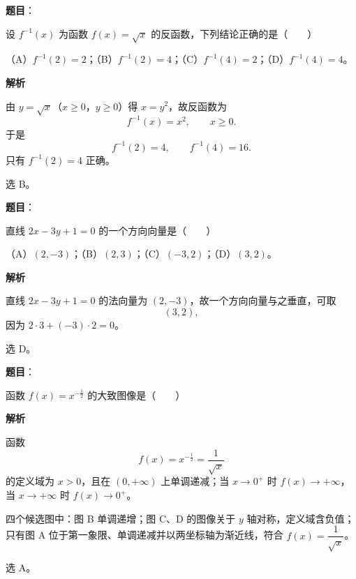 \begin{answer}

\textbf{题目}：

设 $f^{-1}(x)$ 为函数 $f(x)=\sqrt x$ 的反函数，下列结论正确的是\mbox{（　　）}

（A）$f^{-1}(2)=2$；（B）$f^{-1}(2)=4$；（C）$f^{-1}(4)=2$；（D）$f^{-1}(4)=4$。

\textbf{解析}

由 $y=\sqrt x$（$x\geqslant0$，$y\geqslant0$）得 $x=y^2$，故反函数为
\nopagebreak[4]
\[f^{-1}(x)=x^2,\qquad x\geqslant0.\]
于是
\nopagebreak[4]
\[f^{-1}(2)=4,\qquad f^{-1}(4)=16.\]
只有 $f^{-1}(2)=4$ 正确。

选 B。


\end{answer}
\begin{answer}

\textbf{题目}：

直线 $2x-3y+1=0$ 的一个方向向量是\mbox{（　　）}

（A）$(2,-3)$；（B）$(2,3)$；（C）$(-3,2)$；（D）$(3,2)$。

\textbf{解析}

直线 $2x-3y+1=0$ 的法向量为 $(2,-3)$，故一个方向向量与之垂直，可取
\nopagebreak[4]
\[(3,2),\]
因为 $2\cdot3+(-3)\cdot2=0$。

选 D。


\end{answer}
\begin{answer}

\textbf{题目}：

函数 $f(x)=x^{-\frac12}$ 的大致图像是\mbox{（　　）}
\nopagebreak[4]
\begin{center}\end{center}
\nopagebreak[4]
\textbf{解析}

函数
\nopagebreak[4]
\[f(x)=x^{-\frac12}=\frac1{\sqrt x}\]
的定义域为 $x>0$，且在 $(0,+\infty)$ 上单调递减；当 $x\to0^+$ 时 $f(x)\to+\infty$，当 $x\to+\infty$ 时 $f(x)\to0^+$。

四个候选图中：图 B 单调递增；图 C、D 的图像关于 $y$ 轴对称，定义域含负值；只有图 A 位于第一象限、单调递减并以两坐标轴为渐近线，符合 $f(x)=\dfrac1{\sqrt x}$。

选 A。


\end{answer}
